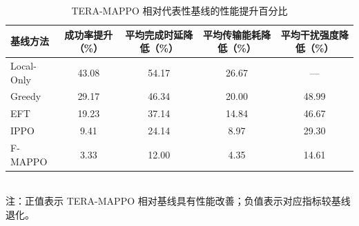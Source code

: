 \begin{table}[htbp]
\centering
\caption{TERA-MAPPO 相对代表性基线的性能提升百分比}
\label{tab:tera_mappo_improvement}
\begin{tabular}{lcccc}
\toprule
基线方法 & 成功率提升（\%） & 平均完成时延降低（\%） & 平均传输能耗降低（\%） & 平均干扰强度降低（\%） \\
\midrule
Local-Only & 43.08 & 54.17 & 26.67 & --- \\
Greedy     & 29.17 & 46.34 & 20.00 & 48.99 \\
EFT        & 19.23 & 37.14 & 14.84 & 46.67 \\
IPPO       & 9.41  & 24.14 & 8.97  & 29.30 \\
F-MAPPO    & 3.33  & 12.00 & 4.35  & 14.61 \\
\bottomrule
\end{tabular}
\\
\vspace{-0.5em}
{\footnotesize
注：正值表示 TERA-MAPPO 相对基线具有性能改善；负值表示对应指标较基线退化。
}
\end{table}
